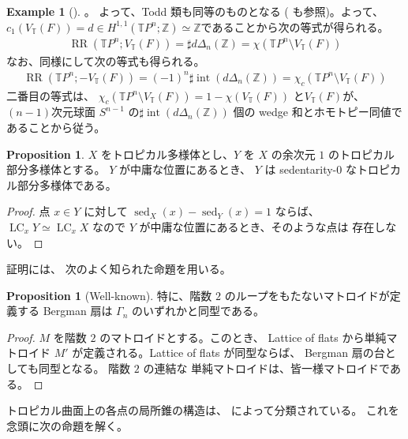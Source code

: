 \documentclass[a4paper,dvipdfmx,reqno,12pt]{amsart}
\theoremstyle{definition}
\newtheorem{example}[theorem]{Example}
\newtheorem{proposition}[theorem]{Proposition}
\newcommand{\opn}[1]{\operatorname{#1}}
\numberwithin{equation}{section}
\begin{document}
\begin{example}[{\cite[Example 2.11]{demedrano2023chern}}]
\cite[Proposition 13.1.2]{MR2810322}。
よって、Todd 類も同等のものとなる
(\cite[Theorem 13.1.6]{MR2810322} も参照)。よって、
$c_1(V_{\mathbb{T}}(F))=d\in H^{1,1}(\mathbb{T}P^{n};
\mathbb{Z})
\simeq \mathbb{Z}$であることから次の等式が得られる。
\begin{align}
\opn{RR}(\mathbb{T}P^{n};V_{\mathbb{T}}(F))=
\sharp d\Delta_n(\mathbb{Z})=
\chi(\mathbb{T}P^{n}\setminus
V_{\mathbb{T}}(F))
\end{align}
なお、同様にして次の等式も得られる。
\begin{align}
\opn{RR}(\mathbb{T}P^{n};-V_{\mathbb{T}}(F))=
(-1)^{n}\sharp \opn{int}(d\Delta_n(\mathbb{Z}))=
\chi_{c}(\mathbb{T}P^{n}\setminus
V_{\mathbb{T}}(F))   
\end{align}
二番目の等式は、
$\chi_{c}(\mathbb{T}P^{n}\setminus
V_{\mathbb{T}}(F))=1-\chi (V_{\mathbb{T}}(F))$
と$V_{\mathbb{T}}(F)$が、$(n-1)$次元球面
$S^{n-1}$ 
の$\sharp \opn{int}(d\Delta_n(\mathbb{Z}))$
個の wedge 和とホモトピー同値であることから従う。
\end{example}

\begin{proposition}
$X$ をトロピカル多様体とし、$Y$ を
$X$ の余次元 $1$
のトロピカル部分多様体とする。
$Y$ が中庸な位置にあるとき、
$Y$ は sedentarity-0 なトロピカル部分多様体である。
\end{proposition}
\begin{proof}
点 $x\in Y$ に対して
$\opn{sed}_X(x)-\opn{sed}_Y(x)=1$ ならば、
$\opn{LC}_xY\simeq \opn{LC}_x X$ なので
$Y$ が中庸な位置にあるとき、そのような点は
存在しない。
\end{proof}

証明には、
次のよく知られた命題を用いる。
\begin{proposition}[{Well-known}]


特に、階数 $2$ のループをもたないマトロイドが定義する
Bergman 扇は $\Gamma_n$ のいずれかと同型である。
\end{proposition}
\begin{proof}
$M$ を階数 $2$ のマトロイドとする。このとき、
Lattice of flats から単純マトロイド
$M'$ が定義される。Lattice of flats が同型ならば、
Bergman 扇の台としても同型となる。
階数 $2$ の連結な
単純マトロイドは、皆一様マトロイドである。
\end{proof}


トロピカル曲面上の各点の局所錐の構造は、
\cite[Corollary 2.4]{shaw2015tropical}
によって分類されている。
これを念頭に次の命題を解く。
\end{document}
